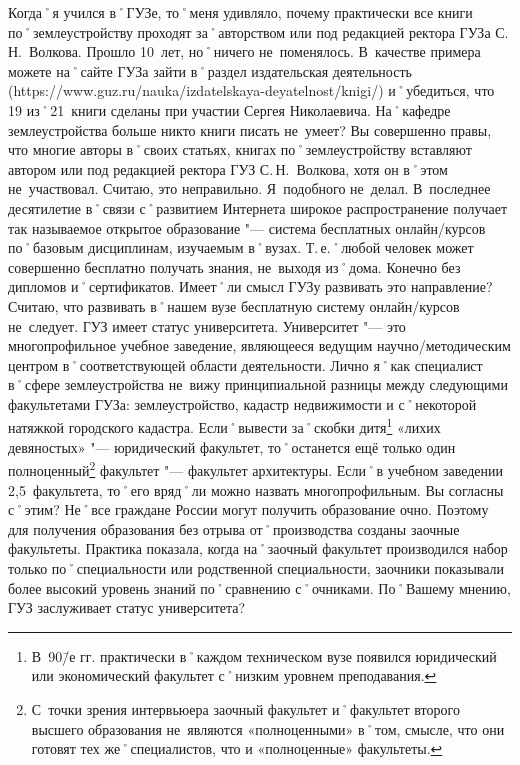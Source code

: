 \begin{drama}
	\maxspeaks Когда˚я учился в˚ГУЗе, то˚меня удивляло, почему практически все книги по˚землеустройству проходят за˚авторством или под редакцией ректора ГУЗа С.\,Н.~Волкова. Прошло 10~лет, но˚ничего не~поменялось. В~качестве примера можете на˚сайте ГУЗа зайти в˚раздел издательская деятельность (https://www.guz.ru/nauka/izdatelskaya-deyatelnost/knigi/) и˚убедиться, что 19 из˚21~книги сделаны при участии Сергея Николаевича. На˚кафедре землеустройства больше никто книги писать не~умеет? 
	\michaelspeaks Вы совершенно правы, что многие авторы в˚своих статьях, книгах по˚землеустройству вставляют автором или под редакцией ректора ГУЗ С.\,Н.~Волкова, хотя он в˚этом не~участвовал. Считаю, это неправильно. Я~подобного не~делал. 
	\maxspeaks В~последнее десятилетие в˚связи с˚развитием Интернета широкое распространение получает так называемое открытое образование "--- система бесплатных онлайн\-/курсов по˚базовым дисциплинам, изучаемым в˚вузах. Т.\,е.˚любой человек может совершенно бесплатно получать знания, не~выходя из˚дома. Конечно без дипломов и˚сертификатов. Имеет˚ли смысл ГУЗу развивать это направление?
	\michaelspeaks Считаю, что развивать в˚нашем вузе бесплатную систему онлайн\-/курсов не~следует.
	\maxspeaks ГУЗ имеет статус университета. Университет "--- это многопрофильное учебное заведение, являющееся ведущим научно\-/методическим центром в˚соответствующей области деятельности. 
Лично я˚как специалист в˚сфере землеустройства не~вижу принципиальной разницы между следующими факультетами ГУЗа: землеустройство, кадастр недвижимости и с˚некоторой натяжкой городского кадастра. Если˚вывести за˚скобки дитя\footnote{В~90\=/е гг. практически в˚каждом техническом вузе появился юридический или экономический факультет с˚низким уровнем преподавания.}  «лихих девяностых» "--- юридический факультет, то˚останется ещё только один полноценный\footnote{С~точки зрения интервьюера заочный факультет и˚факультет второго высшего образования не~являются  «полноценными» в˚том, смысле, что они готовят тех же˚специалистов, что и  «полноценные» факультеты.} факультет "--- факультет архитектуры. Если˚в учебном заведении 2,5~факультета, то˚его вряд˚ли можно назвать многопрофильным. Вы согласны с˚этим?
	\michaelspeaks Не˚все граждане России могут получить образование очно. Поэтому для получения образования без отрыва от˚производства созданы заочные факультеты. Практика показала, когда на˚заочный факультет производился набор только по˚специальности или родственной специальности, заочники показывали более высокий уровень знаний по˚сравнению с˚очниками.
	\maxspeaks По˚Вашему мнению, ГУЗ заслуживает статус университета?

\end{drama}
